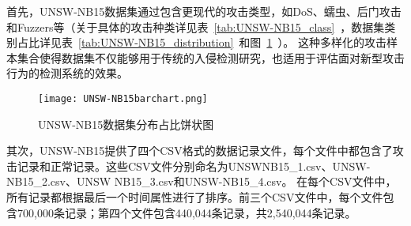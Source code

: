 首先，UNSW-NB15数据集通过包含更现代的攻击类型，如DoS、蠕虫、后门攻击和Fuzzers等（关于具体的攻击种类详见表~\ref{tab:UNSW-NB15_class}~，数据集类别占比详见表~\ref{tab:UNSW-NB15_distribution}~和图~\ref{fig:UNSW-NB15barchart}~）。
这种多样化的攻击样本集合使得数据集不仅能够用于传统的入侵检测研究，也适用于评估面对新型攻击行为的检测系统的效果。

  
  \begin{figure}[htbp]
    \centering
    \texttt{[image: UNSW-NB15barchart.png]}
    \caption{UNSW-NB15数据集分布占比饼状图}
    \label{fig:UNSW-NB15barchart}
    \end{figure}


其次，UNSW-NB15提供了四个CSV格式的数据记录文件，每个文件中都包含了攻击记录和正常记录。这些CSV文件分别命名为UNSWNB15\_1.csv、UNSW-NB15\_2.csv、UNSW NB15\_3.csv和UNSW-NB15\_4.csv。
在每个CSV文件中，所有记录都根据最后一个时间属性进行了排序。前三个CSV文件中，每个文件包含700,000条记录；第四个文件包含440,044条记录，共2,540,044条记录。


